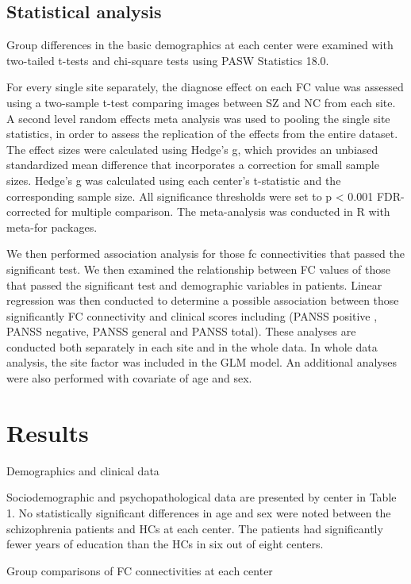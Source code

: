 \documentclass[preprint,authoryear,review,12pt]{elsarticle}
\begin{document}
\subsection*{Statistical analysis}

Group differences in the basic demographics at each center were examined with two-tailed t-tests and chi-square tests using PASW Statistics 18.0.

For every single site separately, the diagnose effect on each FC value was assessed using a two-sample t-test comparing images between SZ and NC from each site. A second level random effects meta analysis was used to pooling the single site statistics, in order to assess the replication of the effects from the entire dataset. The effect sizes were calculated using Hedge’s g, which provides an unbiased standardized mean difference that incorporates a correction for small sample sizes. Hedge’s g was calculated using each center’s t-statistic and the corresponding sample size. All significance thresholds were set to p < 0.001 FDR-corrected for multiple comparison. The meta-analysis was conducted in R with meta-for packages.

We then performed association analysis for those fc connectivities that passed the significant test. We then examined the relationship between FC values of those that passed the significant test and demographic variables in patients.  Linear regression was then conducted to determine a possible association between those significantly FC connectivity and clinical scores including (PANSS positive , PANSS negative, PANSS general and PANSS total). These analyses are conducted both separately in each site and in the whole data. In whole data analysis, the site factor was included in the GLM model. An additional analyses were also performed with covariate of age and sex.

\section*{Results}

Demographics and clinical data

Sociodemographic and psychopathological data are presented by center in Table 1. No statistically significant differences in age and sex were noted between the schizophrenia patients and HCs at each center. The patients had significantly fewer years of education than the HCs in six out of eight centers.

Group comparisons of FC connectivities at each center
\end{document}
